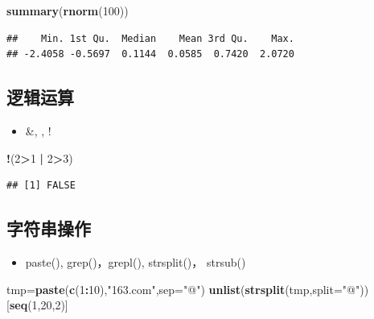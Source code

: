 \documentclass[]{book}
\newenvironment{Shaded}{\begin{snugshade}}{\end{snugshade}}
\newcommand{\DataTypeTok}[1]{\textcolor[rgb]{0.13,0.29,0.53}{#1}}
\newcommand{\DecValTok}[1]{\textcolor[rgb]{0.00,0.00,0.81}{#1}}
\newcommand{\KeywordTok}[1]{\textcolor[rgb]{0.13,0.29,0.53}{\textbf{#1}}}
\newcommand{\NormalTok}[1]{#1}
\newcommand{\OperatorTok}[1]{\textcolor[rgb]{0.81,0.36,0.00}{\textbf{#1}}}
\newcommand{\StringTok}[1]{\textcolor[rgb]{0.31,0.60,0.02}{#1}}
\providecommand{\tightlist}{%
  \setlength{\itemsep}{0pt}\setlength{\parskip}{0pt}}
\begin{document}
\begin{Shaded}
\begin{Highlighting}[]
\KeywordTok{summary}\NormalTok{(}\KeywordTok{rnorm}\NormalTok{(}\DecValTok{100}\NormalTok{))}
\end{Highlighting}
\end{Shaded}

\begin{verbatim}
##    Min. 1st Qu.  Median    Mean 3rd Qu.    Max. 
## -2.4058 -0.5697  0.1144  0.0585  0.7420  2.0720
\end{verbatim}

\hypertarget{section-11}{%
\subsection{逻辑运算}\label{section-11}}

\begin{itemize}
\tightlist
\item
  \&, \textbar{}, !
\end{itemize}

\begin{Shaded}
\begin{Highlighting}[]
\OperatorTok{!}\NormalTok{(}\DecValTok{2}\OperatorTok{>}\DecValTok{1} \OperatorTok{|}\StringTok{ }\DecValTok{2}\OperatorTok{>}\DecValTok{3}\NormalTok{)}
\end{Highlighting}
\end{Shaded}

\begin{verbatim}
## [1] FALSE
\end{verbatim}

\hypertarget{section-12}{%
\subsection{字符串操作}\label{section-12}}

\begin{itemize}
\tightlist
\item
  paste(), grep()，grepl(), strsplit()， strsub()
\end{itemize}

\begin{Shaded}
\begin{Highlighting}[]
\NormalTok{tmp=}\KeywordTok{paste}\NormalTok{(}\KeywordTok{c}\NormalTok{(}\DecValTok{1}\OperatorTok{:}\DecValTok{10}\NormalTok{),}\StringTok{"163.com"}\NormalTok{,}\DataTypeTok{sep=}\StringTok{"@"}\NormalTok{)}
\KeywordTok{unlist}\NormalTok{(}\KeywordTok{strsplit}\NormalTok{(tmp,}\DataTypeTok{split=}\StringTok{"@"}\NormalTok{))[}\KeywordTok{seq}\NormalTok{(}\DecValTok{1}\NormalTok{,}\DecValTok{20}\NormalTok{,}\DecValTok{2}\NormalTok{)]}
\end{Highlighting}
\end{Shaded}
\end{document}
